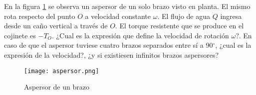 \item En la figura \ref{fig:aspersor} se observa un aspersor de un solo brazo visto en planta. El mismo rota respecto del punto $O$ a velocidad constante $\omega$. El flujo de agua $Q$ ingresa desde un caño vertical a través de $O$. El torque resistente que se produce en el cojinete es $-T_O$. ¿Cual es la expresión que define la velocidad de rotación $\omega$?. En caso de que el aspersor tuviese cuatro brazos separados entre sí a 90$^\circ$, ¿cual es la expresión de la velocidad?, ¿y si existiesen infinitos brazos aspersores?

\begin{figure}[h!!!!]
\centering
\texttt{[image: aspersor.png]}
\caption{Aspersor de un brazo}
\label{fig:aspersor}
\end{figure}

